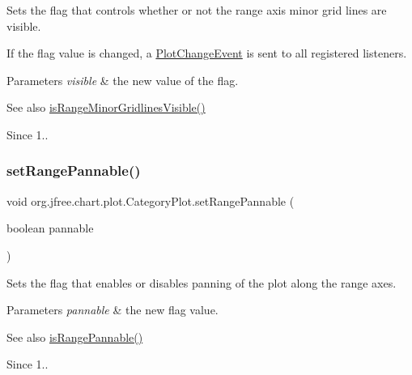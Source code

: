 Sets the flag that controls whether or not the range axis minor grid lines are visible. 

If the flag value is changed, a \mbox{\hyperlink{}{Plot\+Change\+Event}} is sent to all registered listeners.


\begin{DoxyParams}{Parameters}
{\em visible} & the new value of the flag.\\
\hline
\end{DoxyParams}
\begin{DoxySeeAlso}{See also}
\mbox{\hyperlink{classorg_1_1jfree_1_1chart_1_1plot_1_1_category_plot_a92a64a1079b22962279cb676a7b4d10c}{is\+Range\+Minor\+Gridlines\+Visible()}}
\end{DoxySeeAlso}
\begin{DoxySince}{Since}
1.. 
\end{DoxySince}
\mbox{\label{classorg_1_1jfree_1_1chart_1_1plot_1_1_category_plot_ac8f35c81ce79745391ed6d160a1d8ddd}} 
\subsubsection{\texorpdfstring{set\+Range\+Pannable()}{setRangePannable()}}
{\footnotesize\ttfamily void org.\+jfree.\+chart.\+plot.\+Category\+Plot.\+set\+Range\+Pannable (\begin{DoxyParamCaption}\item[{boolean}]{pannable }\end{DoxyParamCaption})}

Sets the flag that enables or disables panning of the plot along the range axes.


\begin{DoxyParams}{Parameters}
{\em pannable} & the new flag value.\\
\hline
\end{DoxyParams}
\begin{DoxySeeAlso}{See also}
\mbox{\hyperlink{classorg_1_1jfree_1_1chart_1_1plot_1_1_category_plot_ae919889b6b612a6f5df7f204a3356d19}{is\+Range\+Pannable()}}
\end{DoxySeeAlso}
\begin{DoxySince}{Since}
1.. 
\end{DoxySince}
\mbox{\label{classorg_1_1jfree_1_1chart_1_1plot_1_1_category_plot_afd2285041f0d986fe129e3c00df3cfe8}} 
